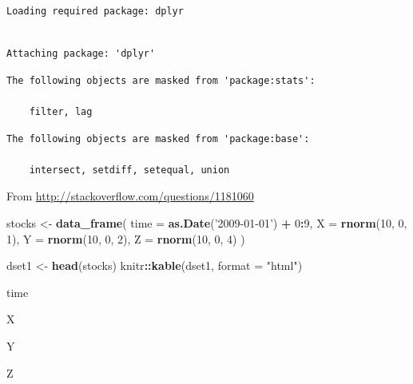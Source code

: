 \documentclass[]{book}
\newenvironment{Shaded}{\begin{snugshade}}{\end{snugshade}}
\newcommand{\DataTypeTok}[1]{\textcolor[rgb]{0.13,0.29,0.53}{#1}}
\newcommand{\DecValTok}[1]{\textcolor[rgb]{0.00,0.00,0.81}{#1}}
\newcommand{\KeywordTok}[1]{\textcolor[rgb]{0.13,0.29,0.53}{\textbf{#1}}}
\newcommand{\NormalTok}[1]{#1}
\newcommand{\OperatorTok}[1]{\textcolor[rgb]{0.81,0.36,0.00}{\textbf{#1}}}
\newcommand{\StringTok}[1]{\textcolor[rgb]{0.31,0.60,0.02}{#1}}
\theoremstyle{definition}
\theoremstyle{definition}
\theoremstyle{definition}
\theoremstyle{remark}
\begin{document}
\begin{verbatim}
Loading required package: dplyr
\end{verbatim}

\begin{verbatim}

Attaching package: 'dplyr'
\end{verbatim}

\begin{verbatim}
The following objects are masked from 'package:stats':

    filter, lag
\end{verbatim}

\begin{verbatim}
The following objects are masked from 'package:base':

    intersect, setdiff, setequal, union
\end{verbatim}

From \url{http://stackoverflow.com/questions/1181060}

\begin{Shaded}
\begin{Highlighting}[]
\NormalTok{stocks <-}\StringTok{ }\KeywordTok{data_frame}\NormalTok{(}
  \DataTypeTok{time =} \KeywordTok{as.Date}\NormalTok{(}\StringTok{'2009-01-01'}\NormalTok{) }\OperatorTok{+}\StringTok{ }\DecValTok{0}\OperatorTok{:}\DecValTok{9}\NormalTok{,}
  \DataTypeTok{X =} \KeywordTok{rnorm}\NormalTok{(}\DecValTok{10}\NormalTok{, }\DecValTok{0}\NormalTok{, }\DecValTok{1}\NormalTok{),}
  \DataTypeTok{Y =} \KeywordTok{rnorm}\NormalTok{(}\DecValTok{10}\NormalTok{, }\DecValTok{0}\NormalTok{, }\DecValTok{2}\NormalTok{),}
  \DataTypeTok{Z =} \KeywordTok{rnorm}\NormalTok{(}\DecValTok{10}\NormalTok{, }\DecValTok{0}\NormalTok{, }\DecValTok{4}\NormalTok{)}
\NormalTok{)}
\end{Highlighting}
\end{Shaded}

\begin{Shaded}
\begin{Highlighting}[]
\NormalTok{dset1 <-}\StringTok{ }\KeywordTok{head}\NormalTok{(stocks)}
\NormalTok{knitr}\OperatorTok{::}\KeywordTok{kable}\NormalTok{(dset1, }\DataTypeTok{format =} \StringTok{"html"}\NormalTok{)}
\end{Highlighting}
\end{Shaded}

time

X

Y

Z
\end{document}
